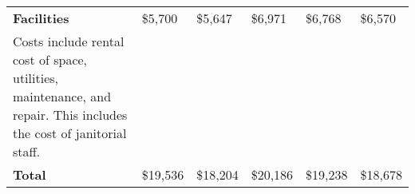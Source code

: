 \begin{tabular}{L{9.5cm} C{1cm} C{1cm} C{1cm} C{1cm} C{1cm}}
\textbf{Facilities} &  \$5,700 	 & 	 \$5,647 	 & 	 \$6,971 	 & 	 \$6,768 	 & 	 \$6,570 	 \\ 
\hspace{.2cm} Costs include rental cost of space, utilities, maintenance, and repair. This includes the cost of janitorial staff.&  \\

\textbf{Total}  & \$19,536 	 & 	 \$18,204 	 & 	 \$20,186 	 & 	 \$19,238 	 & 	 \$18,678 	 \\ 

\bottomrule
\end{tabular}